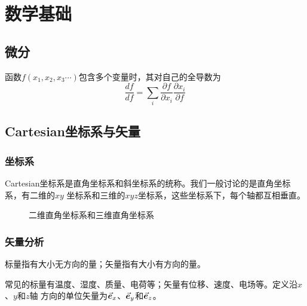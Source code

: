 \chapter{数学基础\label{chapter:reference}}

\section{微分}
\begin{note}
    函数$f(x_1, x_2, x_3\cdots)$包含多个变量时，其对自己的全导数为
    \begin{equation}
        \frac{d f}{d f} = \sum_{i} \frac{\partial f}{\partial x_i} \frac{\partial x_i}{\partial f}
    \end{equation}
\end{note}

\section{Cartesian坐标系与矢量\label{section:reference-cartesian}}

\subsection{坐标系}
Cartesian坐标系是直角坐标系和斜坐标系的统称。我们一般讨论的是直角坐标系，有二维的$xy$
坐标系和三维的$xyz$坐标系，这些坐标系下，每个轴都互相垂直。
\begin{figure}[h]
    \centering
    \setlength{\abovecaptionskip}{0.2cm}
    \caption{二维直角坐标系和三维直角坐标系}
    \label{fig:CartesianCoord}
\end{figure}

\subsection{矢量分析}
\begin{definition}[标量和矢量]
    标量指有大小无方向的量；矢量指有大小有方向的量。 
\end{definition}
常见的标量有温度、湿度、质量、电荷等；矢量有位移、速度、电场等。定义沿$x$、$y$和$z$轴
方向的单位矢量为$\vec{\bm{e}}_x$、$\vec{\bm{e}}_y$和$\vec{\bm{e}}_z$。

